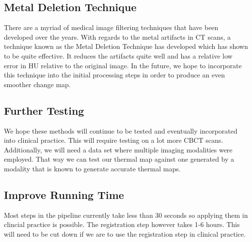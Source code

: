 \documentclass[]{spie}  %
\begin{document}
\subsection{Metal Deletion Technique}

There are a myriad of medical image filtering techniques that have been developed over the years. With regards to the metal artifacts in CT scans, a technique known as the Metal Deletion Technique \cite{Boas11} has developed which has shown to be quite effective. It reduces the artifacts quite well and has a relative low error in HU relative to the original image. In the future, we hope to incorporate this technique into the initial processing steps in order to produce an even smoother change map. 

\subsection{Further Testing}

We hope these methods will continue to be tested and eventually incorporated into clinical practice. This will require testing on a lot more CBCT scans. Additionally, we will need a data set where multiple imaging modalities were employed. That way we can test our thermal map against one generated by a modality that is known to generate accurate thermal maps.

\subsection{Improve Running Time}

Most steps in the pipeline currently take less than 30 seconds so applying them in clincial practice is possible. The registration step however takes 1-6 hours. This will need to be cut down if we are to use the registration step in clinical practice.  



\end{document}
